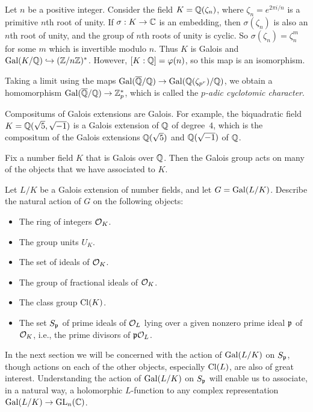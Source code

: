 \begin{example}
	Let $n$ be a positive integer. Consider the field $K=\mathbb{Q}(\zeta_n)$,
	where $\zeta_n=e^{2\pi i/n}$ is a primitive $n$th root of unity.  If
	$\sigma:K\to \mathbb{C}$ is an embedding, then $\sigma(\zeta_n)$ is also an
	$n$th root of unity, and the group of $n$th roots of unity is cyclic.
	So $\sigma(\zeta_n) = \zeta_n^m$ for some $m$ which is invertible
	modulo $n$.  Thus $K$ is Galois and $\operatorname{Gal}(K/\mathbb{Q})\hookrightarrow (\mathbb{Z}/n\mathbb{Z})^*$.
	However, $[K:\mathbb{Q}]=\varphi(n)$, so this map is an isomorphism.
\end{example}

\begin{remark}
	Taking a limit using the maps $\operatorname{Gal}(\overline{\mathbb{Q}}/\mathbb{Q})\to
	\operatorname{Gal}(\mathbb{Q}(\zeta_{p^r})/\mathbb{Q})$, we obtain a homomorphism $\operatorname{Gal}(\overline{\mathbb{Q}}/\mathbb{Q})\to
	\mathbb{Z}_p^*$, which is called the {\em $p$-adic cyclotomic character}.
\end{remark}

Compositums of Galois extensions are Galois.  For example, the
biquadratic field $K=\mathbb{Q}(\sqrt{5},\sqrt{-1})$ is a Galois
extension of $\mathbb{Q}$ of degree~$4$, which is the compositum
of the Galois extensions $\mathbb{Q}(\sqrt{5})$ and $\mathbb{Q}(\sqrt{-1})$ of $\mathbb{Q}$.

Fix a number field $K$ that is Galois over $\mathbb{Q}$.
Then the Galois group acts on many of the objects
that we have associated to $K$.

\begin{exercise}\label{ex:galois-action-on-things}
	Let $L/K$ be a Galois extension of number fields, and let $G = \operatorname{Gal}(L/K)$.
	Describe the natural action of $G$ on the following objects:
	\begin{itemize}
		\item The ring of integers $\mathcal{O}_K$.
		\item The group units $U_K$.
		\item The set of ideals of $\mathcal{O}_K$.
		\item The group of fractional ideals of $\mathcal{O}_K$.
		\item The class group $\operatorname{Cl}(K)$.
		\item The set $S_{\mathfrak{p}}$ of prime ideals of $\mathcal{O}_L$ lying over a given nonzero
		prime ideal $\mathfrak{p}$ of $\mathcal{O}_K$, i.e., the prime divisors of $\mathfrak{p}\mathcal{O}_L$.
	\end{itemize}
\end{exercise}

In the next section we will be concerned with the action of
$\operatorname{Gal}(L/K)$ on $S_{\mathfrak{p}}$, though actions on each of the other objects,
especially $\operatorname{Cl}(L)$, are also of great interest. Understanding the
action of $\operatorname{Gal}(L/K)$ on $S_{\mathfrak{p}}$ will enable us to associate, in a
natural way, a holomorphic $L$-function to any complex representation
$\operatorname{Gal}(L/K) \to \operatorname{GL}_n(\mathbb{C})$.

